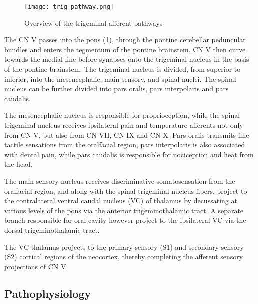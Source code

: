  \begin{figure}[ht]
 \texttt{[image: trig-pathway.png]}
 \centering
 \caption{Overview of the trigeminal afferent pathways}
 \label{fig:trig-pathway}
 \end{figure}
 
The CN V passes into the pons (\ref{fig:trig-pathway}), through the pontine cerebellar peduncular bundles and enters the tegmentum of the pontine brainstem. CN V then curve towards the medial line before synapses onto the trigeminal nucleus in the basis of the pontine brainstem. The trigeminal nucleus is divided, from superior to inferior, into the mesencephalic, main sensory, and spinal nuclei. The spinal nucleus can be further divided into pars oralis, pars interpolaris and pars caudalis. 

The mesencephalic nucleus is responsible for proprioception, while the spinal trigeminal nucleus receives ipsilateral pain and temperature afferents not only from CN V, but also from CN VII, CN IX and CN X. Pars oralis transmits fine tactile sensations from the oralfacial region, pars interpolaris is also associated with dental pain, while pars caudalis is responsible for nociception and heat from the head. 

The main sensory nucleus receives discriminative somatosensation from the oralfacial region, and along with the spinal trigeminal nucleus fibers, project to the contralateral ventral caudal nucleus (VC) of thalamus by decussating at various levels of the pons via the anterior trigeminothalamic tract. A separate branch responsible for oral cavity however project to the ipsilateral VC via the dorsal trigeminothalamic tract.  

The VC thalamus projects to the primary sensory (S1) and secondary sensory (S2) cortical regions of the neocortex, thereby completing the afferent sensory projections of CN V. 



\subsection{Pathophysiology}

